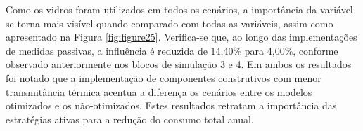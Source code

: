 \begin{figure}[H]
    \centering
\end{figure}
\pagebreak
\noindent Como os vidros foram utilizados em todos os cenários, a importância da variável se torna mais visível quando comparado com todas as variáveis, assim como apresentado na Figura \ref{fig:figure25}. Verifica-se que, ao longo das implementações de medidas passivas, a influência é reduzida de 14,40\% para 4,00\%, conforme observado anteriormente nos blocos de simulação 3 e 4.\vspace*{0.3cm} \newline
\noindent Em ambos os resultados foi notado que a implementação de componentes construtivos com menor transmitância térmica acentua a diferença os cenários entre os modelos otimizados e os não-otimizados. Estes resultados retratam a importância das estratégias ativas para a redução do consumo total anual.
